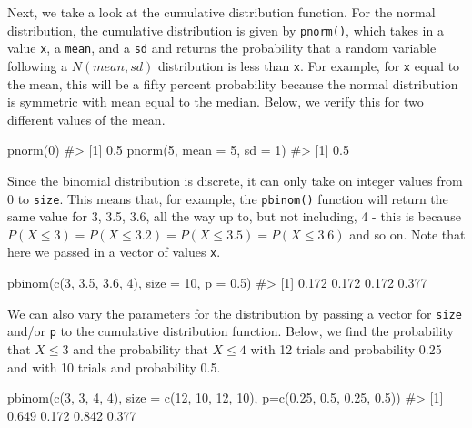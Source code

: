 \documentclass[
  letterpaper,
]{krantz}
\makeatletter
\newenvironment{Shaded}{\begin{snugshade}}{\end{snugshade}}
\newcommand{\AttributeTok}[1]{\textcolor[rgb]{0.40,0.45,0.13}{#1}}
\newcommand{\CommentTok}[1]{\textcolor[rgb]{0.37,0.37,0.37}{#1}}
\newcommand{\DecValTok}[1]{\textcolor[rgb]{0.68,0.00,0.00}{#1}}
\newcommand{\FloatTok}[1]{\textcolor[rgb]{0.68,0.00,0.00}{#1}}
\newcommand{\FunctionTok}[1]{\textcolor[rgb]{0.28,0.35,0.67}{#1}}
\newcommand{\NormalTok}[1]{\textcolor[rgb]{0.00,0.23,0.31}{#1}}
\newenvironment{kframe}{%
\medskip{}
\setlength{\fboxsep}{.8em}
 \def\at@end@of@kframe{}%
 \ifinner\ifhmode%
  \def\at@end@of@kframe{\end{minipage}}%
  \begin{minipage}{\columnwidth}%
 \fi\fi%
 \def\FrameCommand##1{\hskip\@totalleftmargin \hskip-\fboxsep
 \colorbox{shadecolor}{##1}\hskip-\fboxsep
     \hskip-\linewidth \hskip-\@totalleftmargin \hskip\columnwidth}%
 \MakeFramed {\advance\hsize-\width
   \@totalleftmargin\z@ \linewidth\hsize
   \@setminipage}}%
 {\par\unskip\endMakeFramed%
 \at@end@of@kframe}
\renewenvironment{Shaded}{\begin{kframe}}{\end{kframe}}
\makeatother
\begin{document}
Next, we take a look at the cumulative distribution function. For the
normal distribution, the cumulative distribution is given by
\texttt{pnorm()}, which takes in a value \texttt{x}, a \texttt{mean},
and a \texttt{sd} and returns the probability that a random variable
following a \(N(mean, sd)\) distribution is less than \texttt{x}. For
example, for \texttt{x} equal to the mean, this will be a fifty percent
probability because the normal distribution is symmetric with mean equal
to the median. Below, we verify this for two different values of the
mean.

\begin{Shaded}
\begin{Highlighting}[]
\FunctionTok{pnorm}\NormalTok{(}\DecValTok{0}\NormalTok{)}
\CommentTok{\#\textgreater{} [1] 0.5}
\FunctionTok{pnorm}\NormalTok{(}\DecValTok{5}\NormalTok{, }\AttributeTok{mean =} \DecValTok{5}\NormalTok{, }\AttributeTok{sd =} \DecValTok{1}\NormalTok{)}
\CommentTok{\#\textgreater{} [1] 0.5}
\end{Highlighting}
\end{Shaded}

Since the binomial distribution is discrete, it can only take on integer
values from 0 to \texttt{size}. This means that, for example, the
\texttt{pbinom()} function will return the same value for 3, 3.5, 3.6,
all the way up to, but not including, 4 - this is because
\(P(X \leq 3) = P(X \leq 3.2) = P(X \leq 3.5) = P(X \leq 3.6)\) and so
on. Note that here we passed in a vector of values \texttt{x}.

\begin{Shaded}
\begin{Highlighting}[]
\FunctionTok{pbinom}\NormalTok{(}\FunctionTok{c}\NormalTok{(}\DecValTok{3}\NormalTok{, }\FloatTok{3.5}\NormalTok{, }\FloatTok{3.6}\NormalTok{, }\DecValTok{4}\NormalTok{), }\AttributeTok{size =} \DecValTok{10}\NormalTok{, }\AttributeTok{p =} \FloatTok{0.5}\NormalTok{)}
\CommentTok{\#\textgreater{} [1] 0.172 0.172 0.172 0.377}
\end{Highlighting}
\end{Shaded}

We can also vary the parameters for the distribution by passing a vector
for \texttt{size} and/or \texttt{p} to the cumulative distribution
function. Below, we find the probability that \(X \leq 3\) and the
probability that \(X \leq 4\) with 12 trials and probability 0.25 and
with 10 trials and probability 0.5.

\begin{Shaded}
\begin{Highlighting}[]
\FunctionTok{pbinom}\NormalTok{(}\FunctionTok{c}\NormalTok{(}\DecValTok{3}\NormalTok{, }\DecValTok{3}\NormalTok{, }\DecValTok{4}\NormalTok{, }\DecValTok{4}\NormalTok{), }\AttributeTok{size =} \FunctionTok{c}\NormalTok{(}\DecValTok{12}\NormalTok{, }\DecValTok{10}\NormalTok{, }\DecValTok{12}\NormalTok{, }\DecValTok{10}\NormalTok{), }\AttributeTok{p=}\FunctionTok{c}\NormalTok{(}\FloatTok{0.25}\NormalTok{, }\FloatTok{0.5}\NormalTok{, }\FloatTok{0.25}\NormalTok{, }\FloatTok{0.5}\NormalTok{))}
\CommentTok{\#\textgreater{} [1] 0.649 0.172 0.842 0.377}
\end{Highlighting}
\end{Shaded}
\end{document}
